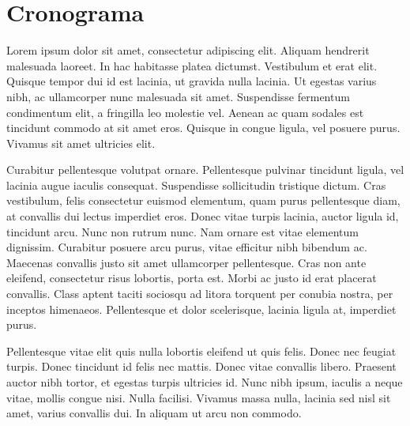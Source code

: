 \chapter{Cronograma}

Lorem ipsum dolor sit amet, consectetur adipiscing elit. Aliquam hendrerit malesuada laoreet. In hac habitasse platea dictumst. Vestibulum et erat elit. Quisque tempor dui id est lacinia, ut gravida nulla lacinia. Ut egestas varius nibh, ac ullamcorper nunc malesuada sit amet. Suspendisse fermentum condimentum elit, a fringilla leo molestie vel. Aenean ac quam sodales est tincidunt commodo at sit amet eros. Quisque in congue ligula, vel posuere purus. Vivamus sit amet ultricies elit.

Curabitur pellentesque volutpat ornare. Pellentesque pulvinar tincidunt ligula, vel lacinia augue iaculis consequat. Suspendisse sollicitudin tristique dictum. Cras vestibulum, felis consectetur euismod elementum, quam purus pellentesque diam, at convallis dui lectus imperdiet eros. Donec vitae turpis lacinia, auctor ligula id, tincidunt arcu. Nunc non rutrum nunc. Nam ornare est vitae elementum dignissim. Curabitur posuere arcu purus, vitae efficitur nibh bibendum ac. Maecenas convallis justo sit amet ullamcorper pellentesque. Cras non ante eleifend, consectetur risus lobortis, porta est. Morbi ac justo id erat placerat convallis. Class aptent taciti sociosqu ad litora torquent per conubia nostra, per inceptos himenaeos. Pellentesque et dolor scelerisque, lacinia ligula at, imperdiet purus.

Pellentesque vitae elit quis nulla lobortis eleifend ut quis felis. Donec nec feugiat turpis. Donec tincidunt id felis nec mattis. Donec vitae convallis libero. Praesent auctor nibh tortor, et egestas turpis ultricies id. Nunc nibh ipsum, iaculis a neque vitae, mollis congue nisi. Nulla facilisi. Vivamus massa nulla, lacinia sed nisl sit amet, varius convallis dui. In aliquam ut arcu non commodo.